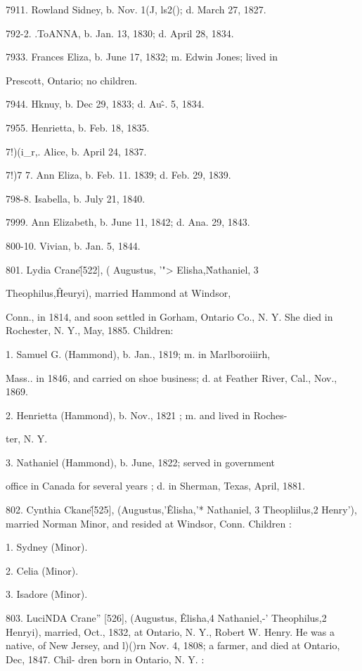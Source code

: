 7911. Rowland Sidney, b. Nov. 1(J, ls2(); d. March 27, 1827. 

792-2. .ToANNA, b. Jan. 13, 1830; d. April 28, 1834. 

7933. Frances Eliza, b. June 17, 1832; m. Edwin Jones; lived in 

Prescott, Ontario; no children. 

7944. Hknuy, b. Dec 29, 1833; d. Au\^-. 5, 1834. 

7955. Henrietta, b. Feb. 18, 1835. 

7!)(i\_r,. Alice, b. April 24, 1837. 

7!)7 7. Ann Eliza, b. Feb. 11. 1839; d. Feb. 29, 1839. 

798-8. Isabella, b. July 21, 1840. 

7999. Ann Elizabeth, b. June 11, 1842; d. Ana. 29, 1843. 

800-10. Vivian, b. Jan. 5, 1844. 

801. Lydia Crane\^ [522], ( Augustus, '"> Elisha,\^ Nathaniel, 3 

Theophilus,\^ Heuryi), married Hammond at Windsor, 

Conn., in 1814, and soon settled in Gorham, Ontario Co., N. Y. 
She died in Rochester, N. Y., May, 1885. Children: 

1. Samuel G. (Hammond), b. Jan., 1819; m. in Marlboroiiirh, 

Mass.. in 1846, and carried on shoe business; d. at Feather 
River, Cal., Nov., 1869. 

2. Henrietta (Hammond), b. Nov., 1821 ; m. and lived in Roches- 

ter, N. Y. 

3. Nathaniel (Hammond), b. June, 1822; served in government 

office in Canada for several years ; d. in Sherman, Texas, 
April, 1881. 




802. Cynthia Ckane\^ [525], (Augustus,'\^ Elisha,'* Nathaniel, 3 
Theopliilus,2 Henry'), married Norman Minor, and resided at 
Windsor, Conn. Children : 

1. Sydney (Minor). 

2. Celia (Minor). 

3. Isadore (Minor). 

803. LuciNDA Crane'' [526], (Augustus, \^ Elisha,4 Nathaniel,-' 
Theophilus,2 Henryi), married, Oct., 1832, at Ontario, N. Y., 
Robert W. Henry. He was a native, of New Jersey, and l)()rn 
Nov. 4, 1808; a farmer, and died at Ontario, Dec, 1847. Chil- 
dren born in Ontario, N. Y. : 

